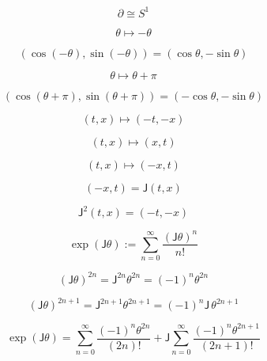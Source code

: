\documentclass[12pt]{article}
\begin{document}
\begin{equation}
\partial\cong S^1
\end{equation}

\begin{equation}
\theta\mapsto -\theta
\end{equation}

\begin{equation}
(\cos(-\theta),\sin(-\theta))=(\cos\theta,-\sin\theta)
\end{equation}

\begin{equation}
\theta\mapsto \theta+\pi
\end{equation}

\begin{equation}
(\cos(\theta+\pi),\sin(\theta+\pi))=(-\cos\theta,-\sin\theta)
\end{equation}

\begin{equation}
(t,x)\mapsto(-t,-x)
\end{equation}

\begin{equation}
(t,x)\mapsto(x,t)
\end{equation}

\begin{equation}
(t,x)\mapsto(-x,t)
\end{equation}

\begin{equation}
(-x,t)=\mathsf{J}(t,x)
\end{equation}

\begin{equation}
\mathsf{J}^2(t,x)=(-t,-x)
\end{equation}

\begin{equation}
\exp(\mathsf{J}\theta):=\sum_{n=0}^{\infty}\frac{(\mathsf{J}\theta)^n}{n!}
\end{equation}

\begin{equation}
(\mathsf{J}\theta)^{2n}=\mathsf{J}^{2n}\theta^{2n}=(-1)^n\theta^{2n}
\end{equation}

\begin{equation}
(\mathsf{J}\theta)^{2n+1}=\mathsf{J}^{2n+1}\theta^{2n+1}=(-1)^n\mathsf{J}\,\theta^{2n+1}
\end{equation}

\begin{equation}
\exp(\mathsf{J}\theta)=\sum_{n=0}^{\infty}\frac{(-1)^n\theta^{2n}}{(2n)!}+\mathsf{J}\sum_{n=0}^{\infty}\frac{(-1)^n\theta^{2n+1}}{(2n+1)!}
\end{equation}
\end{document}
